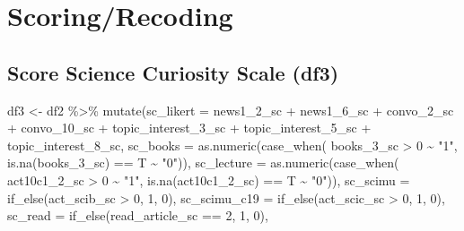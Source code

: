 \documentclass[
]{article}
\newenvironment{Shaded}{\begin{snugshade}}{\end{snugshade}}
\newcommand{\AttributeTok}[1]{\textcolor[rgb]{0.77,0.63,0.00}{#1}}
\newcommand{\DecValTok}[1]{\textcolor[rgb]{0.00,0.00,0.81}{#1}}
\newcommand{\FunctionTok}[1]{\textcolor[rgb]{0.00,0.00,0.00}{#1}}
\newcommand{\NormalTok}[1]{#1}
\newcommand{\OtherTok}[1]{\textcolor[rgb]{0.56,0.35,0.01}{#1}}
\newcommand{\SpecialCharTok}[1]{\textcolor[rgb]{0.00,0.00,0.00}{#1}}
\newcommand{\StringTok}[1]{\textcolor[rgb]{0.31,0.60,0.02}{#1}}
\begin{document}
\hypertarget{scoringrecoding}{%
\section{Scoring/Recoding}\label{scoringrecoding}}

\hypertarget{score-science-curiosity-scale-df3}{%
\subsection{Score Science Curiosity Scale
(df3)}\label{score-science-curiosity-scale-df3}}

\begin{Shaded}
\begin{Highlighting}[]
\NormalTok{df3 }\OtherTok{\textless{}{-}}\NormalTok{ df2 }\SpecialCharTok{\%\textgreater{}\%}
  \FunctionTok{mutate}\NormalTok{(}\AttributeTok{sc\_likert =}\NormalTok{ news1\_2\_sc }\SpecialCharTok{+}\NormalTok{ news1\_6\_sc }\SpecialCharTok{+}\NormalTok{ convo\_2\_sc }\SpecialCharTok{+}\NormalTok{ convo\_10\_sc }\SpecialCharTok{+}
\NormalTok{           topic\_interest\_3\_sc }\SpecialCharTok{+}\NormalTok{ topic\_interest\_5\_sc }\SpecialCharTok{+}\NormalTok{ topic\_interest\_8\_sc,}
         \AttributeTok{sc\_books =} \FunctionTok{as.numeric}\NormalTok{(}\FunctionTok{case\_when}\NormalTok{(}
\NormalTok{           books\_3\_sc }\SpecialCharTok{\textgreater{}} \DecValTok{0} \SpecialCharTok{\textasciitilde{}} \StringTok{"1"}\NormalTok{,}
           \FunctionTok{is.na}\NormalTok{(books\_3\_sc) }\SpecialCharTok{==}\NormalTok{ T }\SpecialCharTok{\textasciitilde{}} \StringTok{"0"}\NormalTok{)),}
         \AttributeTok{sc\_lecture =} \FunctionTok{as.numeric}\NormalTok{(}\FunctionTok{case\_when}\NormalTok{(}
\NormalTok{           act10c1\_2\_sc }\SpecialCharTok{\textgreater{}} \DecValTok{0} \SpecialCharTok{\textasciitilde{}} \StringTok{"1"}\NormalTok{,}
           \FunctionTok{is.na}\NormalTok{(act10c1\_2\_sc) }\SpecialCharTok{==}\NormalTok{ T }\SpecialCharTok{\textasciitilde{}} \StringTok{"0"}\NormalTok{)),}
         \AttributeTok{sc\_scimu =} \FunctionTok{if\_else}\NormalTok{(act\_scib\_sc }\SpecialCharTok{\textgreater{}} \DecValTok{0}\NormalTok{, }\DecValTok{1}\NormalTok{, }\DecValTok{0}\NormalTok{),}
         \AttributeTok{sc\_scimu\_c19 =} \FunctionTok{if\_else}\NormalTok{(act\_scic\_sc }\SpecialCharTok{\textgreater{}} \DecValTok{0}\NormalTok{, }\DecValTok{1}\NormalTok{, }\DecValTok{0}\NormalTok{),}
         \AttributeTok{sc\_read =} \FunctionTok{if\_else}\NormalTok{(read\_article\_sc }\SpecialCharTok{==} \DecValTok{2}\NormalTok{, }\DecValTok{1}\NormalTok{, }\DecValTok{0}\NormalTok{),}

\end{Highlighting}
\end{Shaded}
\end{document}
